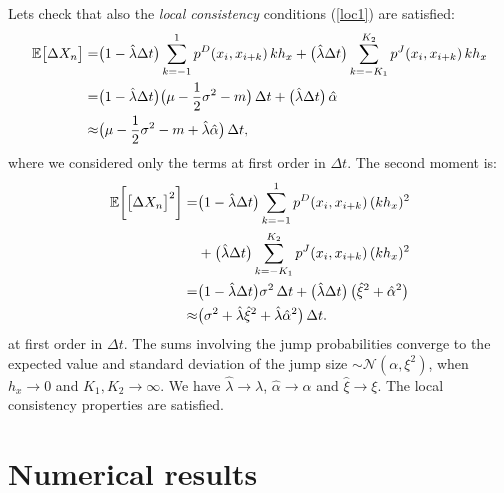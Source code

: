 Lets check that also the \emph{local consistency} conditions (\ref{loc1}) are satisfied:
\begin{align*}
\mathbb{E} \bigl[ \Delta X_n \bigr] =& \bigl(1 - \hat \lambda \Delta t \bigr) \sum_{k=-1}^1 p^D(x_i,x_{i+k}) \, k h_x 
           + \bigl( \hat \lambda \Delta t \bigr) \sum_{k = -K_1}^{K_2} p^J(x_i,x_{i+k}) \, k h_x \\
           =& \bigl(1 - \hat \lambda \Delta t \bigr) \bigl( \mu - \frac{1}{2}\sigma^2 -m \bigr) \, \Delta t  
           + \bigl(\hat \lambda \Delta t \bigr) \, \hat \alpha \\
           \approx& \bigl( \mu - \frac{1}{2}\sigma^2 -m + \hat \lambda \hat \alpha \bigr) \, \Delta t ,
\end{align*}
where we considered only the terms at first order in $\Delta t$. 
The second moment is:
\begin{align*}
 \mathbb{E} \biggl[ \bigl[ \Delta X_n \bigr]^2 \biggr] =&
 \bigl(1 - \hat \lambda \Delta t \bigr) \sum_{k=-1}^1 p^D(x_i,x_{i+k}) \, (k h_x)^2 \\
           &+ \bigl( \hat \lambda \Delta t \bigr) \sum_{k = -K_1}^{K_2} p^J(x_i,x_{i+k}) \, (k h_x)^2 \\
           =& \bigl(1 - \hat \lambda \Delta t \bigr) \sigma^2 \, \Delta t  
           + \bigl(\hat \lambda \Delta t \bigr) \, \bigl( \hat \xi^2 + \hat \alpha^2 \bigr) \\
 \approx& \bigl( \sigma^2 + \hat \lambda \hat \xi^2 + \hat \lambda \hat \alpha^2 \bigr) \, \Delta t.
\end{align*}
at first order in $\Delta t$. 
The sums involving the jump probabilities 
converge to the expected value and standard deviation of the jump size $ \sim \mathcal{N}(\alpha,\xi^2)$, when $h_x \to 0$ and $K_1,K_2 \to \infty$. We have $\hat \lambda \to \lambda$,
$\hat \alpha \to \alpha$ and $\hat \xi \to \xi$.
The local consistency properties are satisfied.







\section{Numerical results}\label{numerical}


